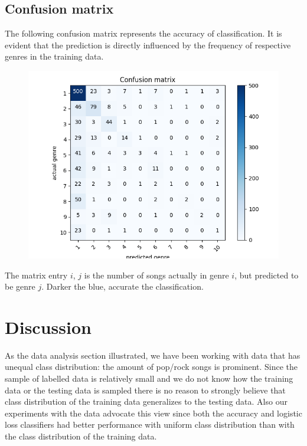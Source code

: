 \documentclass[fleqn,10pt]{SelfArx} %
\begin{document}
\subsection{Confusion matrix}
The following confusion matrix represents the accuracy of classification. It is evident that the prediction is directly influenced by the frequency of respective genres in the training data.
\begin{figure}[H]
  \includegraphics[width=\linewidth]{confusion-matrix.jpg}
\end{figure}

The matrix entry $i$, $j$ is the number of songs actually in genre $i$, but predicted to be genre $j$. Darker the blue, accurate the classification.

\section{Discussion}

As the data analysis section illustrated, we have been working with data that
has unequal class distribution: the amount of pop/rock songs is prominent.
Since the sample of labelled data is relatively small and we do not
know how the training data or the testing data is sampled there is no reason to
strongly believe that class distribution of the training data generalizes to the
testing data. Also our experiments with the data advocate this view since both
the accuracy and logistic loss classifiers had better performance with uniform
class distribution than with the class distribution of the training data.
\end{document}
